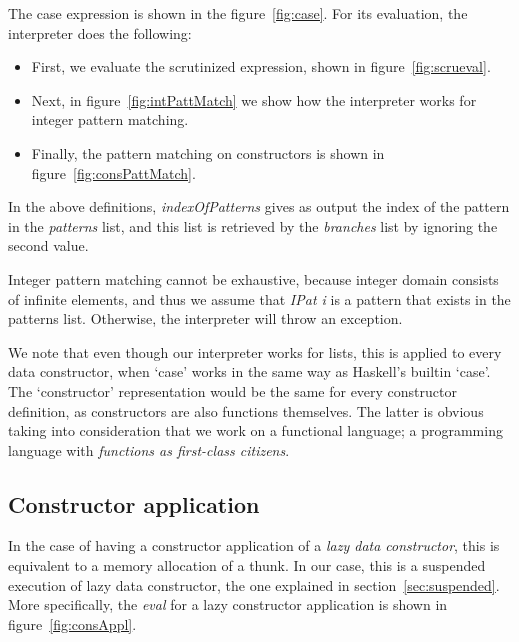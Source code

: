 \documentclass[diploma]{softlab-thesis}
\begin{document}
The case expression is shown in the figure~\ref{fig:case}. For its evaluation, the interpreter 
does the following:~
\begin{itemize}
  \item First, we evaluate the scrutinized expression, shown in figure~\ref{fig:scrueval}.
  \item Next, in figure~\ref{fig:intPattMatch} we show how the interpreter works for 
        integer pattern matching.
  \item Finally, the pattern matching on constructors is shown in figure~\ref{fig:consPattMatch}.
\end{itemize}


In the above definitions, \textit{indexOfPatterns} gives as output the index of the pattern 
in the \textit{patterns} list, and this list is retrieved by the \textit{branches} list 
by ignoring the second value.

Integer pattern matching cannot be exhaustive, because integer domain consists of infinite elements, and thus we 
assume that \textit{IPat i} is a pattern that exists in the patterns list. Otherwise, the interpreter will throw an exception.


We note that even though our interpreter works for lists, this is applied to every data constructor, 
when `case' works in the same way as Haskell's builtin `case'. The `constructor' representation 
would be the same for every constructor definition, as constructors are also functions themselves. 
The latter is obvious taking into consideration that we work on a functional language; 
a programming language with \textit{functions as first-class citizens}.

\subsection{Constructor application}

In the case of having a constructor application of a \textit{lazy data constructor},
this is equivalent to a memory allocation of a thunk. In our case, this is 
a suspended execution of lazy data constructor, the one explained in section~\ref{sec:suspended}.
More specifically, the \textit{eval} for a lazy constructor application 
is shown in figure~\ref{fig:consAppl}.
\end{document}
